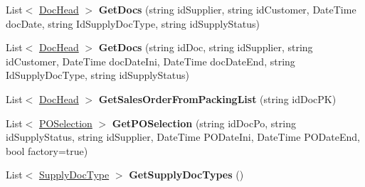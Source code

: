 \begin{DoxyCompactItemize}
\item 
\mbox{\label{class_h_k_supply_1_1_services_1_1_implementations_1_1_e_f_supply_docs_a1784bc4416968abe82bea0a133641d79}} 
List$<$ \mbox{\hyperlink{class_h_k_supply_1_1_models_1_1_supply_1_1_doc_head}{Doc\+Head}} $>$ {\bfseries Get\+Docs} (string id\+Supplier, string id\+Customer, Date\+Time doc\+Date, string Id\+Supply\+Doc\+Type, string id\+Supply\+Status)
\item 
\mbox{\label{class_h_k_supply_1_1_services_1_1_implementations_1_1_e_f_supply_docs_a711ac4672ffab767bd3758810b844ea1}} 
List$<$ \mbox{\hyperlink{class_h_k_supply_1_1_models_1_1_supply_1_1_doc_head}{Doc\+Head}} $>$ {\bfseries Get\+Docs} (string id\+Doc, string id\+Supplier, string id\+Customer, Date\+Time doc\+Date\+Ini, Date\+Time doc\+Date\+End, string Id\+Supply\+Doc\+Type, string id\+Supply\+Status)
\item 
\mbox{\label{class_h_k_supply_1_1_services_1_1_implementations_1_1_e_f_supply_docs_a49512f67624320df93dfc1482f8bc98e}} 
List$<$ \mbox{\hyperlink{class_h_k_supply_1_1_models_1_1_supply_1_1_doc_head}{Doc\+Head}} $>$ {\bfseries Get\+Sales\+Order\+From\+Packing\+List} (string id\+Doc\+PK)
\item 
\mbox{\label{class_h_k_supply_1_1_services_1_1_implementations_1_1_e_f_supply_docs_a501b1e47372831da791900b7cfdc5e3c}} 
List$<$ \mbox{\hyperlink{class_h_k_supply_1_1_classes_1_1_p_o_selection}{P\+O\+Selection}} $>$ {\bfseries Get\+P\+O\+Selection} (string id\+Doc\+Po, string id\+Supply\+Status, string id\+Supplier, Date\+Time P\+O\+Date\+Ini, Date\+Time P\+O\+Date\+End, bool factory=true)
\item 
\mbox{\label{class_h_k_supply_1_1_services_1_1_implementations_1_1_e_f_supply_docs_a291ca96ed40dacb85b8151d14602e664}} 
List$<$ \mbox{\hyperlink{class_h_k_supply_1_1_models_1_1_supply_1_1_supply_doc_type}{Supply\+Doc\+Type}} $>$ {\bfseries Get\+Supply\+Doc\+Types} ()
\item 
\mbox{\label{class_h_k_supply_1_1_services_1_1_implementations_1_1_e_f_supply_docs_a9a08a77117ec26e7f34d596daf7c3017}} 

\end{DoxyCompactItemize}
